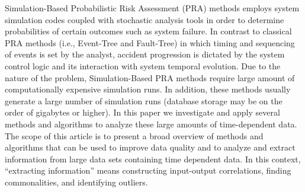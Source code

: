 Simulation-Based Probabilistic Risk Assessment (PRA) methods employs
system simulation codes coupled with stochastic analysis tools
in order to determine probabilities of certain outcomes such as 
system failure.
In contrast to classical PRA methods (i.e., Event-Tree and Fault-Tree)
in which timing and sequencing of events is set by the analyst,
accident progression is dictated by the system control logic 
and its interaction with system temporal evolution.
Due to the nature of the problem, Simulation-Based PRA methods require 
large amount of computationally expensive simulation 
runs. 
In addition, these methods usually generate a 
large number of simulation runs (database storage may be on the order of 
gigabytes or higher). 
In this paper we investigate and apply several methods 
and algorithms to analyze these large amounts of time-dependent data. 
The scope of this article is to present a broad overview of methods and 
algorithms that can be used to improve data quality and to analyze and extract information from large 
data sets containing time dependent data. In this context, “extracting information” 
means constructing input-output correlations, finding commonalities, and identifying 
outliers. 
